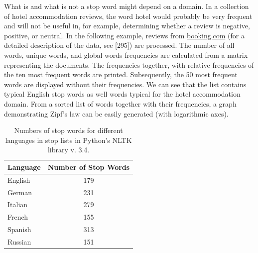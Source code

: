 \documentclass[11pt,openany,executivepaper]{book}
\begin{document}
What is and what is not a stop word might depend on a domain. In a collection of hotel accommodation reviews, the word hotel would probably be very frequent and will not be useful in, for example, determining whether a review is negative, positive, or neutral. In the following example, reviews from \href{http://booking.com}{booking.com} (for a detailed description of the data, see [295]) are processed. The number of all words, unique words, and global words frequencies are calculated from a matrix representing the documents. The frequencies together, with relative frequencies of the ten most frequent words are printed. Subsequently, the 50 most frequent words are displayed without their frequencies. We can see that the list contains typical English stop words as well words typical for the hotel accommodation domain. From a sorted list of words together with their frequencies, a graph demonstrating Zipf's law can be easily generated (with logarithmic axes).

\begin{table}[ht!]
\begin{center}
\caption{Numbers of stop words for different languages in stop lists in Python's NLTK library v. 3.4.}
\begin{tabular}{l|c}
\hline
Language & Number of Stop Words \\
\hline
English & 179 \\
German & 231 \\
Italian & 279 \\
French & 155 \\
Spanish & 313 \\
Russian & 151 \\
\hline
\end{tabular}
\end{center}
\end{table}
\vspace{12pt}
\end{document}
